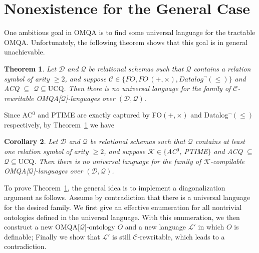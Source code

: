 \documentclass[letterpaper]{article} %
\newtheorem{thm}{Theorem}
\newtheorem{cor}[thm]{Corollary}
\theoremstyle{definition}
\theoremstyle{remark}
\theoremstyle{definition}
\begin{document}
\section{Nonexistence for the General Case}

One ambitious goal in OMQA is to find some universal language for the tractable OMQA. Unfortunately, the following theorem shows that this goal is in general unachievable.

\begin{thm}\label{thm:no_forewritable_univ_lang}
Let $\mathscr{D}$ and $\mathscr{Q}$ be relational schemas such that $\mathscr{Q}$ contains a relation symbol of arity $\ge 2$, and suppose $\mathcal{C}\in\{\textit{FO},\textit{FO}\,(+,\times),\textit{Datalog}^\neg(\le)\}$ and ACQ $\subseteq$ $\mathcal{Q}\subseteq\text{UCQ}$. Then there is no universal language for the family of $\mathcal{C}$-rewritable OMQA[$\mathcal{Q}$]-languages over $(\mathscr{D},\mathscr{Q})$.
\end{thm}

Since AC$^0$ and PTIME are exactly captured by FO$(+,\times)$ and Datalog$^\neg(\le)$ respectively, by Theorem~\ref{thm:no_forewritable_univ_lang} we have

\begin{cor}
Let $\mathscr{D}$ and $\mathscr{Q}$ be relational schemas such that $\mathscr{Q}$ contains at least one relation symbol of arity $\ge 2$, and suppose $\mathcal{K}\!\in\!\{$AC$^0$, PTIME$\}$ and ACQ $\subseteq$ $\mathcal{Q}\subseteq\text{UCQ}$. Then there is no universal language for the family of $\mathcal{K}$-compilable OMQA[$\mathcal{Q}$]-languages over $(\mathscr{D},\mathscr{Q})$.
\end{cor}



To prove Theorem~\ref{thm:no_forewritable_univ_lang}, the general idea is to implement a diagonalization argument as follows. Assume by contradiction that there is a universal language for the desired family. We first give an effective enumeration for all nontrivial ontologies defined in the universal language. With this enumeration, we then construct a new OMQA[$\mathcal{Q}$]-ontology $O$ and a new language $\mathcal{L}'$ in which $O$ is definable; Finally we show that $\mathcal{L}'$ is still $\mathcal{C}$-rewritable, which leads to a contradiction.  
\end{document}
